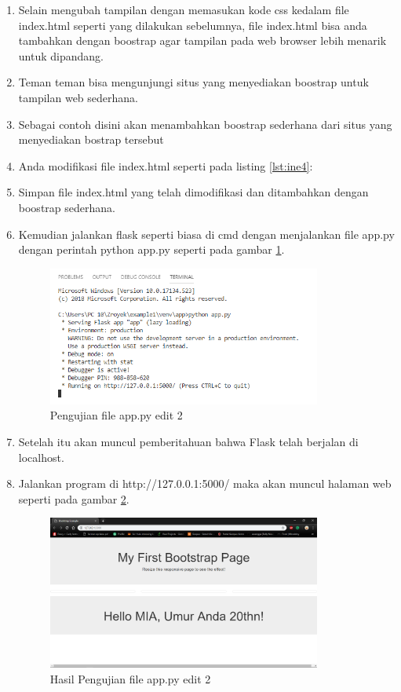 \begin{enumerate}
\item Selain mengubah tampilan dengan memasukan kode css kedalam file index.html seperti yang dilakukan sebelumnya, file index.html bisa anda tambahkan dengan boostrap agar tampilan pada web browser lebih menarik untuk dipandang.
\item Teman teman bisa mengunjungi situs yang menyediakan boostrap untuk tampilan web sederhana.
\item Sebagai contoh disini akan menambahkan boostrap sederhana dari situs yang menyediakan bostrap tersebut 
\item Anda modifikasi file index.html seperti pada listing \ref{lst:ine4}:


\item Simpan file index.html yang telah dimodifikasi dan ditambahkan dengan boostrap sederhana.
\item Kemudian jalankan flask seperti biasa di cmd dengan menjalankan file app.py dengan perintah python app.py seperti pada gambar \ref{fig:ufaa}.
\begin{figure}[!htbp]
	\centerline{\includegraphics[width=0.85\textwidth]{figures/13/ufaa.PNG}}
	\caption{Pengujian file app.py edit 2}
	\label{fig:ufaa}
\end{figure}

\item Setelah itu akan muncul pemberitahuan bahwa Flask telah berjalan di localhost.
\item Jalankan program di http://127.0.0.1:5000/ maka akan muncul halaman web seperti pada gambar \ref{fig:hufaa}.
\begin{figure}[!htbp]
	\centerline{\includegraphics[width=0.85\textwidth]{figures/13/hufaa.PNG}}
	\caption{Hasil Pengujian file app.py edit 2}
	\label{fig:hufaa}
\end{figure}


\end{enumerate}
